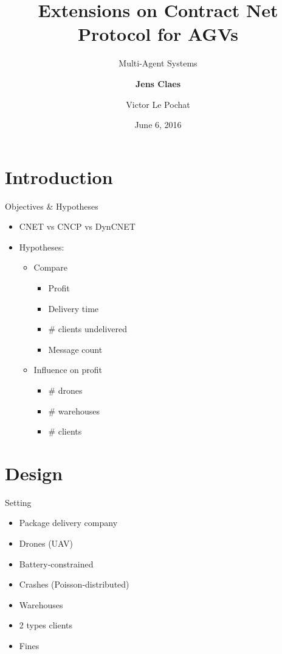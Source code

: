 \documentclass{beamer}
\title{Extensions on Contract Net Protocol for AGVs}
\subtitle{Multi-Agent Systems}
\author{\textbf{Jens Claes} \and Victor Le Pochat}
\date{June 6, 2016}
\begin{document}
	\frame{\titlepage}

	\section{Introduction}
	
	\begin{frame}{Objectives \& Hypotheses}
		\begin{itemize}
		\item CNET vs CNCP vs DynCNET
		\item Hypotheses:
			\begin{itemize}
			\item Compare
				\begin{itemize}
				\item Profit
				\item Delivery time
				\item \# clients undelivered
				\item Message count
				\end{itemize}
			\item Influence on profit
				\begin{itemize}
				\item \# drones
				\item \# warehouses
				\item \# clients
				\end{itemize}
			\end{itemize}
		\end{itemize}
	\end{frame}
		
	\section{Design}
	\begin{frame}{Setting}
		\begin{itemize}
		\item Package delivery company
		\item Drones (UAV)
		\item Battery-constrained
		\item Crashes (Poisson-distributed)
		\item Warehouses
		\item 2 types clients
		\item Fines
		\end{itemize}
	\end{frame}
	
	
\end{document}
